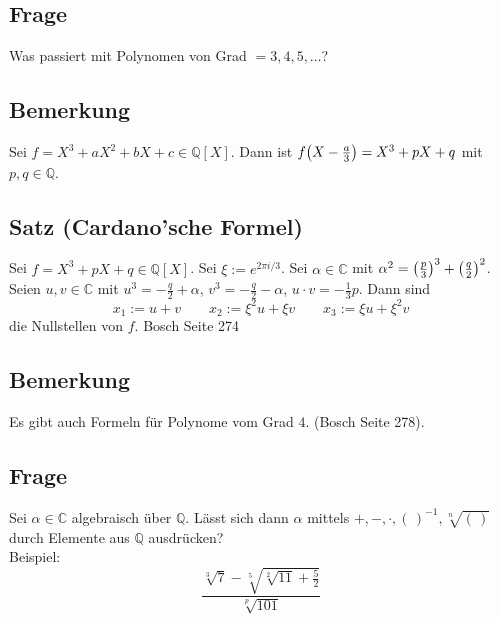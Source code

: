 \subsection[Frage, ob es entsprechende Formeln auch für Polynome höheren Grades gibt]{Frage} %
\label{sub:12.2}
Was passiert mit Polynomen von Grad $=3,4,5, \ldots $?

\subsection[Bemerkung: Formel um Polynome auf die Form für die Cardon'sche Formel zu bringen]{Bemerkung} %
\label{sub:12.3}
Sei $f= X^3+ a X^2 + bX + c \in \mathds{Q}[X]$. Dann ist $f \enbrace*{X- \frac{a}{3} } = X^3+pX+q $ mit $p,q \in \mathds{Q}$.

\subsection{Satz (Cardano'sche Formel)} %
\label{sub:12.4}
Sei $f= X^3+ pX+q \in \mathds{Q}[X]$. Sei $\xi := e^{2 \pi  i/3}$. Sei $\alpha \in \mathds{C}$ mit $\alpha^2= \enbrace*{\frac{p}{3} }^3+ \enbrace*{\frac{q}{2} }^2  $.
Seien $u,v \in \mathds{C}$ mit $u^3= - \frac{q}{2}+ \alpha $, $v^3= - \frac{q}{2}- \alpha $, $u \cdot v= - \frac{1}{3}p $. Dann sind
\[
	x_1 := u+v \qquad x_2 := \xi^2 u + \xi v \qquad x_3 := \xi u + \xi^2 v
\]
die Nullstellen von $f$.
Bosch Seite 274 \bewende

\subsection[Bemerkung: Es gibt auch Formeln für Polynome mit dem Grad 4]{Bemerkung} %
\label{sub:12.5}
Es gibt auch Formeln für Polynome vom Grad $4$. (Bosch Seite 278).

\subsection[Frage, ob alle algebraischen Elemente durch Grundrechenarten+Wurzeln darstellbar]{Frage} %
\label{sub:12.6}
Sei $\alpha \in \mathds{C}$ algebraisch über $\mathds{Q}$. Lässt sich dann $\alpha$ mittels $+,-, \cdot , (\,)^{-1}, \sqrt[n]{(\,)}  $ durch Elemente aus $\mathds{Q}$ ausdrücken?\\
Beispiel: 
\[
	\frac{\sqrt[3]{7}- \sqrt[5]{\sqrt[2]{11} + \frac{5}{2}  }    }{\sqrt[p]{101}  } 
\]	

